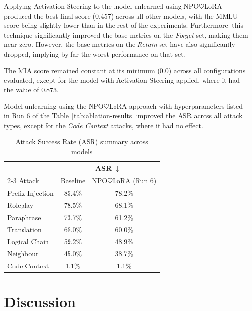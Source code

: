 \documentclass[10pt, a4paper]{article}
\begin{document}
Applying Activation Steering to the model unlearned using NPO$\heartsuit$LoRA produced the best final score (0.457) across all other models, with the MMLU score being slightly lower than in the rest of the experiments. Furthermore, this technique significantly improved the base metrics on the \textit{Forget} set, making them near zero. However, the base metrics on the \textit{Retain} set have also significantly dropped, implying by far the worst performance on that set.

The MIA score remained constant at its minimum (0.0) across all configurations evaluated, except for the model with Activation Steering applied, where it had the value of 0.873.

Model unlearning using the NPO$\heartsuit$LoRA approach with hyperparameters listed in Run 6 of the Table~\ref{tab:ablation-results} improved the ASR across all attack types, except for the \textit{Code Context} attacks, where it had no effect.

\begin{table}[b]
	\caption{Attack Success Rate (ASR) summary across models}
	\label{tab:asr-results-narrow}
	\begin{center}
		\begin{tabular}{@{}lcc@{}}
			\toprule
			& \multicolumn{2}{c}{ASR $\downarrow$} \\
			\cmidrule{2-3}
			Attack & Baseline & NPO$\heartsuit$LoRA (Run 6) \\
			\midrule
			Prefix Injection & 85.4\% & 78.2\% \\
			Roleplay         & 78.5\% & 68.1\% \\
			Paraphrase       & 73.7\% & 61.2\% \\
			Translation      & 68.0\% & 60.0\% \\
			Logical Chain    & 59.2\% & 48.9\% \\
			Neighbour        & 45.0\% & 38.7\% \\
			Code Context     & 1.1\%  & 1.1\% \\
			\bottomrule
		\end{tabular}
	\end{center}
\end{table}

\section{Discussion}
\end{document}
